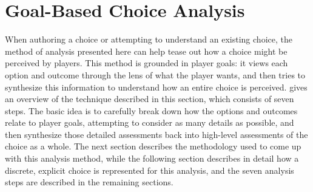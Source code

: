 \section{Goal-Based Choice Analysis}

\label{sec:goal-based-choice-analysis}

When authoring a choice or attempting to understand an existing choice, the method of analysis presented here can help tease out how a choice might be perceived by players.
%
This method is grounded in player goals: it views each option and outcome through the lens of what the player wants, and then tries to synthesize this information to understand how an entire choice is perceived.
%
 gives an overview of the technique described in this section, which consists of seven steps.
%
The basic idea is to carefully break down how the options and outcomes relate to player goals, attempting to consider as many details as possible, and then synthesize those detailed assessments back into high-level assessments of the choice as a whole.
%
The next section describes the methodology used to come up with this analysis method, while the following section describes in detail how a discrete, explicit choice is represented for this analysis, and the seven analysis steps are described in the remaining sections.


